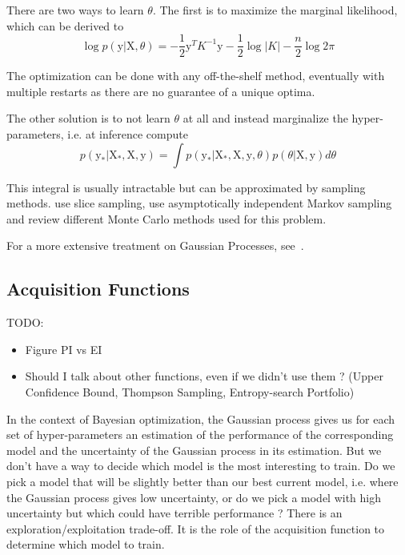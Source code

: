 There are two ways to learn $\theta$. The first is to maximize the marginal likelihood, which can be derived to  
\begin{equation}
	\log p\left(\mathrm{y} | \mathrm{X}, \theta \right) = - \frac{1}{2} \mathrm{y}^T K^{-1} \mathrm{y} - \frac{1}{2} \log |K| - \frac{n}{2} \log 2 \pi
\end{equation}

The optimization can be done with any off-the-shelf method, eventually with multiple restarts as there are no guarantee of a unique optima. 

The other solution is to not learn $\theta$ at all and instead marginalize the hyper-parameters, i.e. at inference compute 
\begin{equation}
    p\left( \mathrm{y_*} | \mathrm{X_*}, \mathrm{X}, \mathrm{y} \right)
    = \int p\left( \mathrm{y_*} | \mathrm{X_*}, \mathrm{X}, \mathrm{y}, \theta \right) p \left( \theta | \mathrm{X}, \mathrm{y} \right) d\theta
\end{equation}

This integral is usually intractable but can be approximated by sampling methods. \textcite{murray2010NIPS} use slice sampling, \textcite{garbuno2016CSDA} use asymptotically independent Markov sampling and \textcite{titsias2011} review different Monte Carlo methods used for this problem.

For a more extensive treatment on Gaussian Processes, see~\textcite{rasmussen2005}.

\subsection{Acquisition Functions}
\label{ssec:acqfunc}

TODO:
\begin{itemize}
    \item Figure PI vs EI
    \item Should I talk about other functions, even if we didn't use them ? (Upper Confidence Bound, Thompson Sampling, Entropy-search Portfolio)
\end{itemize}

In the context of Bayesian optimization, the Gaussian process gives us for each set of hyper-parameters an estimation of the performance of the corresponding model and the uncertainty of the Gaussian process in its estimation. But we don't have a way to decide which model is the most interesting to train. Do we pick a model that will be slightly better than our best current model, i.e. where the Gaussian process gives low uncertainty, or do we pick a model with high uncertainty but which could have terrible performance ? There is an exploration/exploitation trade-off. It is the role of the acquisition function to determine which model to train.

